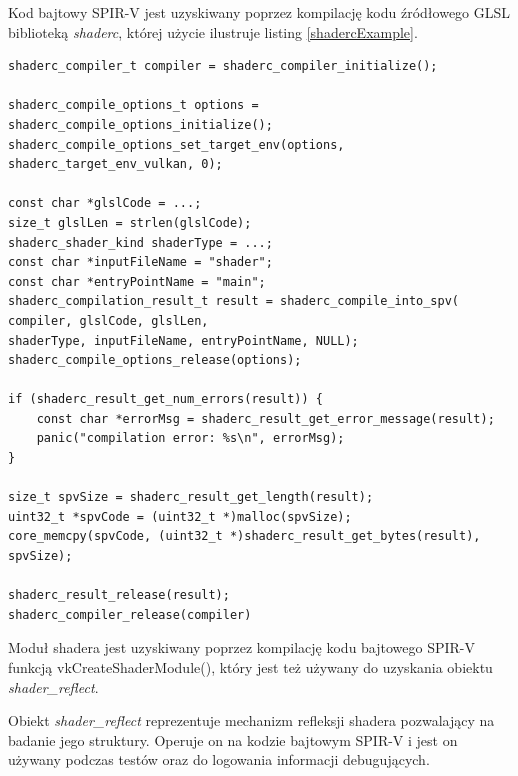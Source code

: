 Kod bajtowy SPIR-V jest uzyskiwany poprzez kompilację kodu źródłowego GLSL biblioteką \textit{shaderc}, której użycie ilustruje listing \ref{shadercExample}.
\lstset{language=C}
\begin{lstlisting}[caption={Kompilacja kodu źródłowego GLSL biblioteką \textit{shaderc}},captionpos=b,label={shadercExample}]
shaderc_compiler_t compiler = shaderc_compiler_initialize();

shaderc_compile_options_t options = shaderc_compile_options_initialize();
shaderc_compile_options_set_target_env(options, shaderc_target_env_vulkan, 0);

const char *glslCode = ...;
size_t glslLen = strlen(glslCode);
shaderc_shader_kind shaderType = ...;
const char *inputFileName = "shader";
const char *entryPointName = "main";
shaderc_compilation_result_t result = shaderc_compile_into_spv(
compiler, glslCode, glslLen,
shaderType, inputFileName, entryPointName, NULL);
shaderc_compile_options_release(options);

if (shaderc_result_get_num_errors(result)) {
	const char *errorMsg = shaderc_result_get_error_message(result);
	panic("compilation error: %s\n", errorMsg);
}

size_t spvSize = shaderc_result_get_length(result);
uint32_t *spvCode = (uint32_t *)malloc(spvSize);
core_memcpy(spvCode, (uint32_t *)shaderc_result_get_bytes(result), spvSize);

shaderc_result_release(result);
shaderc_compiler_release(compiler)
\end{lstlisting}

Moduł shadera jest uzyskiwany poprzez kompilację kodu bajtowego SPIR-V funkcją vkCreateShaderModule(), który jest też używany do uzyskania obiektu \textit{shader\_reflect}.

Obiekt \textit{shader\_reflect} reprezentuje mechanizm refleksji shadera pozwalający na badanie jego struktury.
Operuje on na kodzie bajtowym SPIR-V i jest on używany podczas testów oraz do logowania informacji debugujących.



